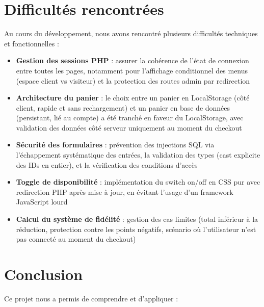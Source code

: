 \documentclass[a4paper,12pt]{article}
\begin{document}
\section{Difficultés rencontrées}

Au cours du développement, nous avons rencontré plusieurs difficultés techniques et fonctionnelles :

\begin{itemize}
    \item \textbf{Gestion des sessions PHP} : assurer la cohérence de l'état de connexion entre toutes les pages, notamment pour l'affichage conditionnel des menus (espace client vs visiteur) et la protection des routes admin par redirection
    
    \item \textbf{Architecture du panier} : le choix entre un panier en LocalStorage (côté client, rapide et sans rechargement) et un panier en base de données (persistant, lié au compte) a été tranché en faveur du LocalStorage, avec validation des données côté serveur uniquement au moment du checkout
    
    \item \textbf{Sécurité des formulaires} : prévention des injections SQL via l'échappement systématique des entrées, la validation des types (cast explicite des IDs en entier), et la vérification des conditions d'accès
    
    \item \textbf{Toggle de disponibilité} : implémentation du switch on/off en CSS pur avec redirection PHP après mise à jour, en évitant l'usage d'un framework JavaScript lourd
    
    
    \item \textbf{Calcul du système de fidélité} : gestion des cas limites (total inférieur à la réduction, protection contre les points négatifs, scénario où l'utilisateur n'est pas connecté au moment du checkout)
\end{itemize}

\section{Conclusion}

Ce projet nous a permis de comprendre et d'appliquer :
\end{document}
